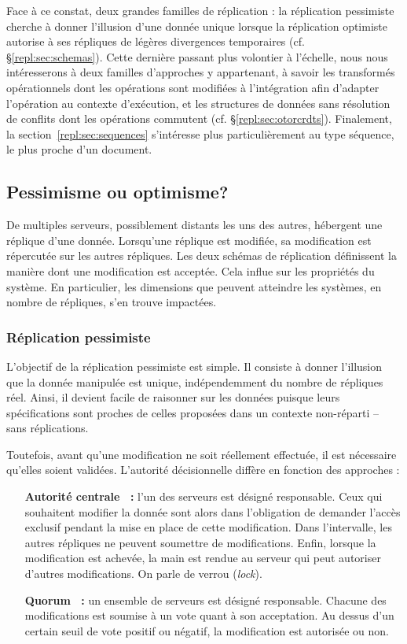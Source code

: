 Face à ce constat, deux grandes familles de réplication : la réplication
pessimiste cherche à donner l'illusion d'une donnée unique lorsque la
réplication optimiste autorise à ses répliques de légères divergences
temporaires (cf. §\ref{repl:sec:schemas}). Cette dernière passant plus volontier
à l'échelle, nous nous intéresserons à deux familles d'approches y appartenant,
à savoir les transformés opérationnels dont les opérations sont modifiées à
l'intégration afin d'adapter l'opération au contexte d'exécution, et les
structures de données sans résolution de conflits dont les opérations commutent
(cf. §\ref{repl:sec:otorcrdts}). Finalement, la section~\ref{repl:sec:sequences}
s'intéresse plus particulièrement au type séquence, le plus proche d'un
document.


\subsection{Pessimisme ou optimisme?}
\label{repl:subsec:schemas}

De multiples serveurs, possiblement distants les uns des autres, hébergent une
réplique d'une donnée. Lorsqu'une réplique est modifiée, sa modification est
répercutée sur les autres répliques. Les deux schémas de réplication définissent
la manière dont une modification est acceptée. Cela influe sur les propriétés du
système. En particulier, les dimensions que peuvent atteindre les systèmes, en
nombre de répliques, s'en trouve impactées.

\subsubsection{Réplication pessimiste}
\label{repl:subsubsec:pessimistic}

L'objectif de la réplication pessimiste est simple. Il consiste à donner
l'illusion que la donnée manipulée est unique, indépendemment du nombre de
répliques réel. Ainsi, il devient facile de raisonner sur les données puisque
leurs spécifications sont proches de celles proposées dans un contexte
non-réparti -- sans réplications.

Toutefois, avant qu'une modification ne soit réellement effectuée, il est
nécessaire qu'elles soient validées. L'autorité décisionnelle diffère en fonction
des approches :
\begin{itemize}
\item [\textbf{Autorité centrale~\cite{alsberg1976principle} :}] l'un des
  serveurs est désigné responsable. Ceux qui souhaitent modifier la donnée sont
  alors dans l'obligation de demander l'accès exclusif pendant la mise en place
  de cette modification. Dans l'intervalle, les autres répliques ne peuvent
  soumettre de modifications. Enfin, lorsque la modification est achevée, la
  main est rendue au serveur qui peut autoriser d'autres modifications. On parle
  de verrou (\emph{lock}).
\item [\textbf{Quorum~\cite{gifford1979weighted} :}] un ensemble de serveurs est
  désigné responsable. Chacune des modifications est soumise à un vote quant à
  son acceptation. Au dessus d'un certain seuil de vote positif ou négatif, la
  modification est autorisée ou non.
\end{itemize}


